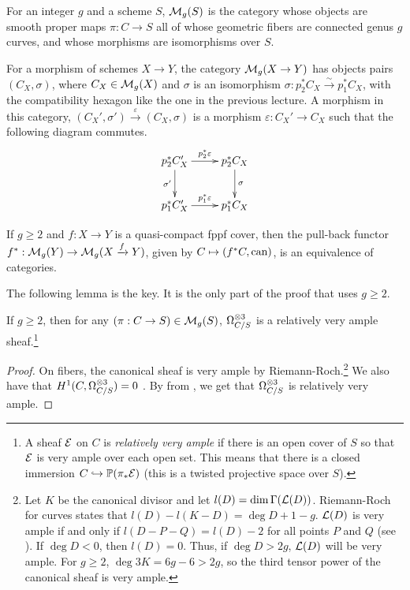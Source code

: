 
 \begin{definition}
   For an integer $g$ and a scheme $S$, $\mathcal{M}_g(S)$ is the category whose objects are
   smooth proper maps $\pi:C\to S$ all of whose geometric fibers are connected genus $g$
   curves, and whose morphisms are isomorphisms over $S$.

   For a morphism of schemes $X\to Y$, the category $\mathcal{M}_g(X\to Y)$ has objects pairs
   $(C_X,\sigma)$, where $C_X\in \mathcal{M}_g(X)$ and $\sigma$ is an isomorphism
   $\sigma:p_2^*C_X\xrightarrow\sim p_1^* C_X$, with the compatibility hexagon like the
   one in the previous lecture. A morphism in this category, $(C_X',\sigma')\xrightarrow
   \varepsilon (C_X,\sigma)$ is a morphism $\varepsilon:C_X'\to C_X$ such that the
   following diagram commutes.
   \[\xymatrix{
    p_2^* C_X' \ar[r]^{p_2^* \varepsilon} \ar[d]_{\sigma'} & p_2^* C_X \ar[d]^{\sigma}\\
    p_1^*C_X' \ar[r]^{p_1^*\varepsilon} & p_1^* C_X
   }\]
 \end{definition}
 \begin{proposition} \label{lec08P:descent_Mg}
   If $g\ge 2$ and $f:X\to Y$ is a quasi-compact fppf cover, then the pull-back functor
   $f^*:\mathcal{M}_g(Y)\to \mathcal{M}_g(X\xrightarrow f Y)$, given by $C\mapsto (f^*C,\text{\rm can})$,
   is an equivalence of categories.
 \end{proposition}
 The following lemma is the key. It is the only part of the proof that uses $g\ge 2$.
 \begin{lemma}
   If $g\ge 2$, then for any $(\pi:C\to S)\in \mathcal{M}_g(S)$, $\Omega_{C/S}^{\otimes 3}$ is a
   relatively very ample sheaf.\footnote{A sheaf $\mathcal{E}$ on $C$ is \emph{relatively
   very ample} if there is an open cover of $S$ so that $\mathcal{E}$ is very ample over
   each open set. This means that there is a closed immersion $C\hookrightarrow
   \mathbb{P}(\pi_*\mathcal{E})$ (this is a twisted projective space over $S$).}
 \end{lemma}
 \begin{proof}
   On fibers, the canonical sheaf is very ample by Riemann-Roch.\footnote{Let $K$ be the
   canonical divisor and let $l(D)=\dim \Gamma(\mathcal{L}(D))$. Riemann-Roch for curves
   states that $l(D)-l(K-D)=\deg D+1-g$. $\mathcal{L}(D)$ is very ample if and only if
   $l(D-P-Q)=l(D)-2$ for all points $P$ and $Q$ (see \cite[IV \S3]{Hartshorne}). If $\deg
   D< 0$, then $l(D)=0$. Thus, if $\deg D>2g$, $\mathcal{L}(D)$ will be very ample. For
   $g\ge 2$, $\deg 3K = 6g-6> 2g$, so the third tensor power of the canonical sheaf is
   very ample.} We also have that $H^1(C,\Omega_{C/S}^{\otimes 3})=0$ . By
    from \cite[III \S9]{Hartshorne}, we get that $\Omega_{C/S}^{\otimes 3}$
   is relatively very ample.
 \end{proof}

